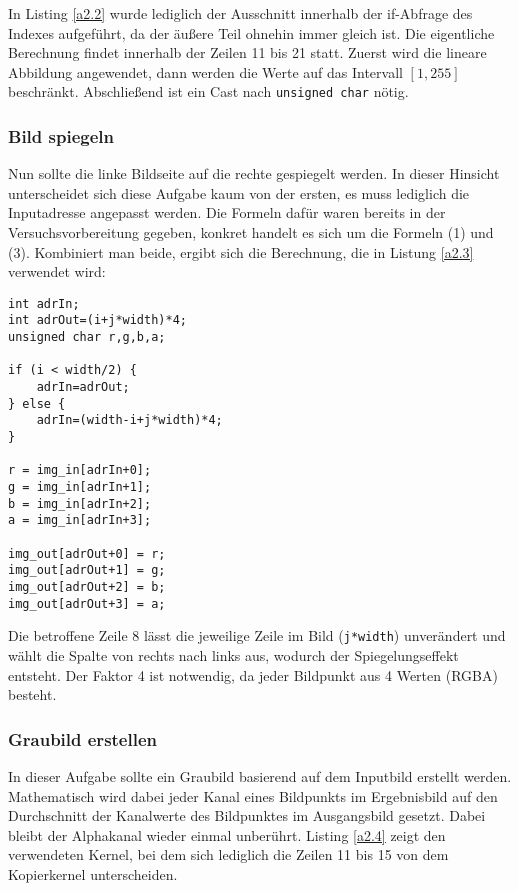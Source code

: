 \documentclass[12pt,a4paper]{scrartcl}
\begin{document}
In Listing \ref{a2.2} wurde lediglich der Ausschnitt innerhalb der if-Abfrage des Indexes aufgef\"uhrt, da der \"au\ss ere Teil ohnehin immer gleich ist.
Die eigentliche Berechnung findet innerhalb der Zeilen 11 bis 21 statt.
Zuerst wird die lineare Abbildung angewendet, dann werden die Werte auf das Intervall $[1,255]$ beschr\"ankt.
Abschlie\ss end ist ein Cast nach \texttt{unsigned char} n\"otig.

\subsubsection{Bild spiegeln}
Nun sollte die linke Bildseite auf die rechte gespiegelt werden.
In dieser Hinsicht unterscheidet sich diese Aufgabe kaum von der ersten, es muss lediglich die Inputadresse angepasst werden.
Die Formeln daf\"ur waren bereits in der Versuchsvorbereitung gegeben, konkret handelt es sich um die Formeln (1) und (3).
Kombiniert man beide, ergibt sich die Berechnung, die in Listung \ref{a2.3} verwendet wird:

\begin{lstlisting}[caption=mirrorKernel,label=a2.3]
int adrIn;
int adrOut=(i+j*width)*4;
unsigned char r,g,b,a;

if (i < width/2) {
    adrIn=adrOut;
} else {
    adrIn=(width-i+j*width)*4;
}

r = img_in[adrIn+0];
g = img_in[adrIn+1];
b = img_in[adrIn+2];
a = img_in[adrIn+3];

img_out[adrOut+0] = r;
img_out[adrOut+1] = g;
img_out[adrOut+2] = b;
img_out[adrOut+3] = a;

\end{lstlisting}

Die betroffene Zeile 8 l\"asst die jeweilige Zeile im Bild (\texttt{j*width}) unver\"andert und w\"ahlt die Spalte von rechts nach links aus, wodurch der Spiegelungseffekt entsteht.
Der Faktor 4 ist notwendig, da jeder Bildpunkt aus 4 Werten (RGBA) besteht.

\subsubsection{Graubild erstellen}
In dieser Aufgabe sollte ein Graubild basierend auf dem Inputbild erstellt werden.
Mathematisch wird dabei jeder Kanal eines Bildpunkts im Ergebnisbild auf den Durchschnitt der Kanalwerte des Bildpunktes im Ausgangsbild gesetzt.
Dabei bleibt der Alphakanal wieder einmal unber\"uhrt.
Listing \ref{a2.4} zeigt den verwendeten Kernel, bei dem sich lediglich die Zeilen 11 bis 15 von dem Kopierkernel unterscheiden. 
\end{document}
